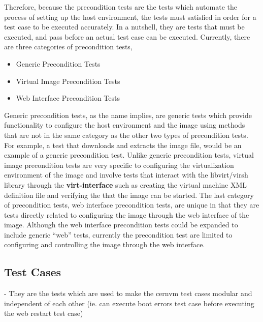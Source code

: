 Therefore, because the precondition tests are the tests which automate the process of setting up the host environment, the tests must
satisfied in order for a \cernvm test case to be executed accurately. In a nutshell, they are tests that must be executed, and pass before an 
actual test case can be executed. Currently, there are three categories of precondition tests, 

\begin{itemize}
\item	Generic Precondition Tests
\item	Virtual Image Precondition Tests
\item	Web Interface Precondition Tests
\end{itemize}

Generic precondition tests, as the name implies, are generic tests which provide functionality to configure the host environment and the
\cernvm image using methods that are not in the same category as the other two types of precondition tests. For example, a test that 
downloads and extracts the \cernvm image file, would be an example of a generic precondition test. Unlike generic precondition tests, 
virtual image precondition tests are very specific to configuring the virtualization environment of the \cernvm image and involve tests 
that interact with the libvirt/virsh library through the {\bf virt-interface} such as creating the virtual machine XML definition file 
and verifying the that the \cernvm image can be started. The last category of precondition tests, web interface precondition tests, 
are unique in that they are tests directly related to configuring the \cernvm image through the web interface of the \cernvm image. 
Although the web interface precondition tests could be expanded to include generic ``web'' tests, currently the precondition test are 
limited to configuring and controlling the \cernvm image through the web interface.




\subsection{\cernvm Test Cases}
\label{sec:cernvmtestcases}



- They are the tests which are used to make the cernvm test cases modular and
  independent of each other (ie. can execute boot errors test case before executing
  the web restart test case)
 